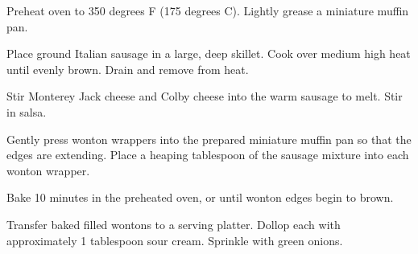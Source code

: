 
\info[servings=24,
		time = 35,
		source = mom,
		sourcetext = 23/12/2005]{}


\begin{ingredientsh}
\end{ingredientsh}


\begin{preparation}
	\step Preheat oven to 350 degrees F (175 degrees C). Lightly grease a miniature muffin pan.
	
	\step Place ground Italian sausage in a large, deep skillet. Cook over medium high heat until evenly brown. Drain and remove from heat.
	
	\step Stir Monterey Jack cheese and Colby cheese into the warm sausage to melt. Stir in salsa.
	
	\step Gently press wonton wrappers into the prepared miniature muffin pan so that the edges are extending. Place a heaping tablespoon of the sausage mixture into each wonton wrapper.
	
	\step Bake 10 minutes in the preheated oven, or until wonton edges begin to brown.
	
	\step Transfer baked filled wontons to a serving platter. Dollop each with approximately 1 tablespoon sour cream. Sprinkle with green onions.
\end{preparation}

\begin{notes}
\end{notes}
